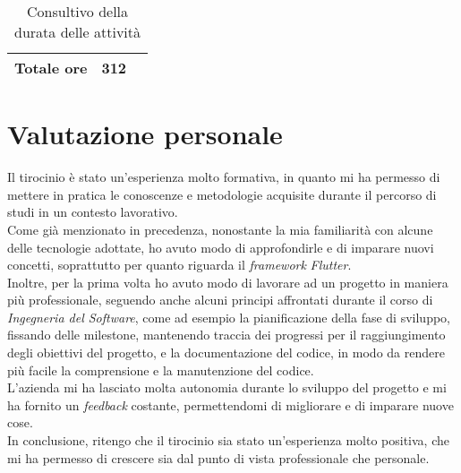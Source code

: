 \begin{table}
\begin{tabularx}{\textwidth}{|c|c|X|}
        \textbf{Totale ore} & \multicolumn{1}{|X|}{\textbf{312}} \\ 
        \hline
        
    \end{tabularx}
    \caption{Consultivo della durata delle attività}
    \label{tab:consultivo-ore}
\end{table}

\section{Valutazione personale}
\label{sec:valutazione-personale}

Il tirocinio è stato un'esperienza molto formativa, in quanto mi ha permesso di mettere in pratica le conoscenze e metodologie acquisite durante il percorso di studi in un contesto lavorativo.\\
Come già menzionato in precedenza, nonostante la mia familiarità con alcune delle tecnologie adottate, ho avuto modo di approfondirle e di imparare nuovi concetti, soprattutto per quanto riguarda il \emph{framework} \emph{Flutter}.\\
Inoltre, per la prima volta ho avuto modo di lavorare ad un progetto in maniera più professionale, seguendo anche alcuni principi affrontati durante il corso di \emph{Ingegneria del Software}, come ad esempio la pianificazione della fase di sviluppo, fissando delle \gls{milestone}\glsoccur, mantenendo traccia dei progressi per il raggiungimento degli obiettivi del progetto, e la documentazione del codice, in modo da rendere più facile la comprensione e la manutenzione del codice.\\  
L'azienda mi ha lasciato molta autonomia durante lo sviluppo del progetto e mi ha fornito un \emph{feedback} costante, permettendomi di migliorare e di imparare nuove cose. \\
In conclusione, ritengo che il tirocinio sia stato un'esperienza molto positiva, che mi ha permesso di crescere sia dal punto di vista professionale che personale.